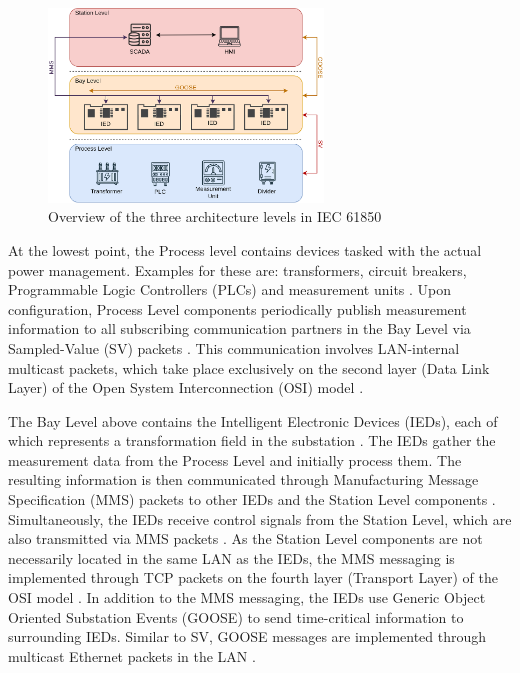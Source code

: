 \documentclass[conference, onecolumn, a4paper]{IEEEtran}
\begin{document}
\begin{figure}[h]
    \centering
    \includegraphics[width=0.65\textwidth]{images/IEC61850_Architecture.png}
    \caption{Overview of the three architecture levels in IEC 61850 \cite{SGRWin_IEC61850Architecture:2021}}
    \label{image:IEC61850Architecture}
\end{figure}

\noindent At the lowest point, the Process level contains devices tasked with the actual power management. Examples for these are: transformers, circuit 
breakers, Programmable Logic Controllers (PLCs) and measurement units \cite{SGRWin_IEC61850Architecture:2021}. Upon configuration, Process Level components 
periodically publish measurement information to all subscribing communication partners in the Bay Level via Sampled-Value (SV) packets 
\cite{TyphoonHIL_IEC61850SV:2021}. This communication involves LAN-internal multicast packets, which take place exclusively on the second layer 
(Data Link Layer) of the Open System Interconnection (OSI) model \cite{TyphoonHIL_IEC61850SV:2021}. 

\smallskip
The Bay Level above contains the Intelligent Electronic Devices (IEDs), each of which represents a transformation field in the substation 
\cite[p. 39]{IEC61850-7-1:2011}. The IEDs gather the measurement data from the Process Level and initially process them. The resulting information 
is then communicated through Manufacturing Message Specification (MMS) packets to other IEDs and the Station Level components \cite[p. 44]{IEC61850-8-1:2011}. 
Simultaneously, the IEDs receive control signals from the Station Level, which are also transmitted via MMS packets \cite{trafficGen_IEC61850:2011}. 
As the Station Level components are not necessarily located in the same LAN as the IEDs, the MMS messaging is implemented through TCP packets on the 
fourth layer (Transport Layer) of the OSI model \cite[p. 45]{IEC61850-8-1:2011}. In addition to the MMS messaging, the IEDs use Generic Object 
Oriented Substation Events (GOOSE) to send time-critical information to surrounding IEDs. Similar to SV, GOOSE messages are implemented through 
multicast Ethernet packets in the LAN \cite{GOOSE_confidentiality_integrity:2020}.
\end{document}
